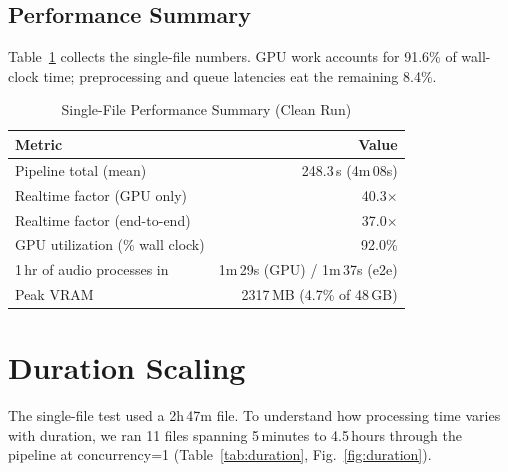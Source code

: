 \documentclass[conference,10pt]{IEEEtran}
\begin{document}
\subsection{Performance Summary}

Table~\ref{tab:perfsummary} collects the single-file numbers. GPU work accounts
for 91.6\% of wall-clock time; preprocessing and queue latencies eat the
remaining 8.4\%.

\begin{table}[!t]
\centering
\caption{Single-File Performance Summary (Clean Run)}
\label{tab:perfsummary}
\begin{tabular}{@{}lr@{}}
\toprule
\textbf{Metric} & \textbf{Value} \\
\midrule
Pipeline total (mean)           & 248.3\,s (4m\,08s) \\
Realtime factor (GPU only)      & 40.3$\times$ \\
Realtime factor (end-to-end)    & 37.0$\times$ \\
GPU utilization (\% wall clock) & 92.0\% \\
1\,hr of audio processes in     & 1m\,29s (GPU) / 1m\,37s (e2e) \\
Peak VRAM                       & \num{2317}\,MB (4.7\% of 48\,GB) \\
\bottomrule
\end{tabular}
\end{table}

\section{Duration Scaling}
\label{sec:duration}

The single-file test used a 2h\,47m file. To understand how processing time
varies with duration, we ran 11 files spanning 5\,minutes to 4.5\,hours through
the pipeline at concurrency=1 (Table~\ref{tab:duration},
Fig.~\ref{fig:duration}).
\end{document}
